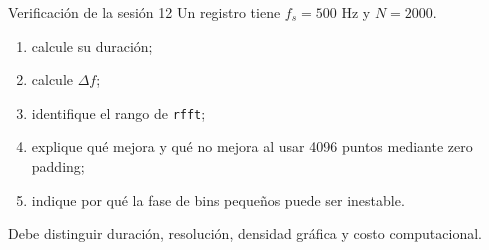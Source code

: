 \documentclass[
  ignorenonframetext,
  aspectratio=169,
  spanish,
]{beamer}
\providecommand{\tightlist}{%
  \setlength{\itemsep}{0pt}\setlength{\parskip}{0pt}}
\begin{document}
\begin{frame}[fragile]{Verificación de la sesión 12}
  \protect{}\label{verificaciuxf3n-de-la-sesiuxf3n-12}
  Un registro tiene \(f_s=500\) Hz y \(N=2000\).

  \begin{enumerate}
    \tightlist
    \item
          calcule su duración;
    \item
          calcule \(\Delta f\);
    \item
          identifique el rango de \texttt{rfft};
    \item
          explique qué mejora y qué no mejora al usar 4096 puntos mediante zero
          padding;
    \item
          indique por qué la fase de bins pequeños puede ser inestable.
  \end{enumerate}

  \begin{tcolorbox}[enhanced jigsaw, arc=.35mm, bottomrule=.15mm, bottomtitle=1mm, breakable, colback=white, colbacktitle=quarto-callout-tip-color!10!white, colframe=quarto-callout-tip-color-frame, coltitle=black, left=2mm, leftrule=.75mm, opacityback=0, opacitybacktitle=0.6, rightrule=.15mm, title=\textcolor{quarto-callout-tip-color}{\faLightbulb}\hspace{0.5em}{Criterio de logro}, titlerule=0mm, toprule=.15mm, toptitle=1mm]

    Debe distinguir duración, resolución, densidad gráfica y costo
    computacional.

  \end{tcolorbox}
\end{frame}
\end{document}
